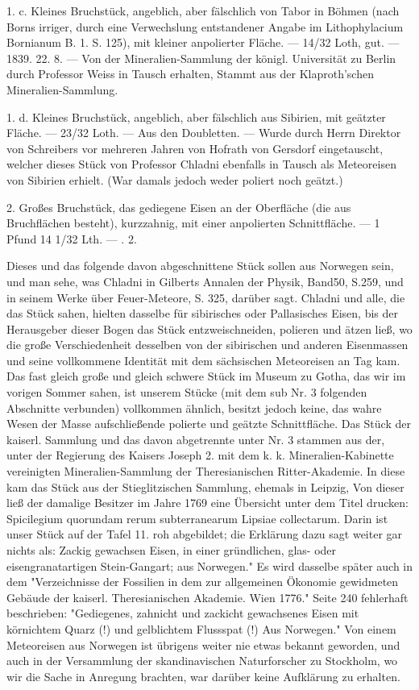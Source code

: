 \documentclass[a4paper, 11pt, oneside, polutonikogreek, german]{article}
\begin{document}
1. c. Kleines Bruchstück, angeblich, aber fälschlich von Tabor in Böhmen (nach Borns irriger, durch eine Verwechslung entstandener Angabe im Lithophylacium Bornianum B. 1. S. 125), mit kleiner anpolierter Fläche. — 14/32 Loth, gut. — 1839. 22. 8. — Von der Mineralien-Sammlung der königl. Universität zu Berlin durch Professor Weiss in Tausch erhalten, Stammt aus der Klaproth'schen Mineralien-Sammlung.

1. d. Kleines Bruchstück, angeblich, aber fälschlich aus Sibirien, mit geätzter Fläche. — 23/32 Loth. — Aus den Doubletten. — Wurde durch Herrn Direktor von Schreibers vor mehreren Jahren von Hofrath von Gersdorf eingetauscht, welcher dieses Stück von Professor Chladni ebenfalls in Tausch als Meteoreisen von Sibirien erhielt. (War damals jedoch weder poliert noch geätzt.)

2. Großes Bruchstück, das gediegene Eisen an der Oberfläche (die aus Bruchflächen besteht), kurzzahnig, mit einer anpolierten Schnittfläche. — 1 Pfund 14 1/32 Lth. — . 2.

Dieses und das folgende davon abgeschnittene Stück sollen aus Norwegen sein, und man sehe, was Chladni in Gilberts Annalen der Physik, Band50, S.259, und in seinem Werke über Feuer-Meteore, S. 325, darüber sagt. Chladni und alle, die das Stück sahen, hielten dasselbe für sibirisches oder Pallasisches Eisen, bis der Herausgeber dieser Bogen das Stück entzweischneiden, polieren und ätzen ließ, wo die große Verschiedenheit desselben von der sibirischen und anderen Eisenmassen und seine vollkommene Identität mit dem sächsischen Meteoreisen an Tag kam. Das fast gleich große und gleich schwere Stück im Museum zu Gotha, das wir im vorigen Sommer sahen, ist unserem Stücke (mit dem sub Nr. 3 folgenden Abschnitte verbunden) vollkommen ähnlich, besitzt jedoch keine, das wahre Wesen der Masse aufschließende polierte und geätzte Schnittfläche. Das Stück der kaiserl. Sammlung und das davon abgetrennte unter Nr. 3 stammen aus der, unter der Regierung des Kaisers Joseph 2. mit dem k. k. Mineralien-Kabinette vereinigten Mineralien-Sammlung der Theresianischen Ritter-Akademie. In diese kam das Stück aus der Stieglitzischen Sammlung, ehemals in Leipzig, Von dieser ließ der damalige Besitzer im Jahre 1769 eine Übersicht unter dem Titel drucken: Spicilegium quorundam rerum subterranearum Lipsiae collectarum. Darin ist unser Stück auf der Tafel 11. roh abgebildet; die Erklärung dazu sagt weiter gar nichts als: Zackig gewachsen Eisen, in einer gründlichen, glas- oder eisengranatartigen Stein-Gangart; aus Norwegen." Es wird dasselbe später auch in dem "Verzeichnisse der Fossilien in dem zur allgemeinen Ökonomie gewidmeten Gebäude der kaiserl. Theresianischen Akademie. Wien 1776." Seite 240 fehlerhaft beschrieben: "Gediegenes, zahnicht und zackicht gewachsenes Eisen mit körnichtem Quarz (!) und gelblichtem Flussspat (!) Aus Norwegen." Von einem Meteoreisen aus Norwegen ist übrigens weiter nie etwas bekannt geworden, und auch in der Versammlung der skandinavischen Naturforscher zu Stockholm, wo wir die Sache in Anregung brachten, war darüber keine Aufklärung zu erhalten.
\end{document}
